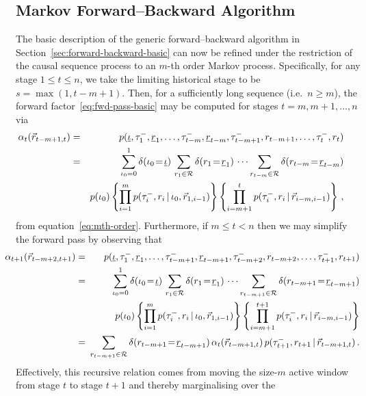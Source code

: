 \documentclass[a4paper]{article}
\newcommand{\ui}{\underline{\iota}}
\newcommand{\ur}{\underline{r}}
\newcommand{\vr}{\vec{r}}
\newcommand{\tm}{\tau^{-}}
\begin{document}
\subsection{Markov Forward--Backward Algorithm}
\label{sec:forward-backward-markov}

The basic description of the generic forward--backward algorithm in Section~\ref{sec:forward-backward-basic}
can now be refined under the restriction of the causal sequence process to an $m$-th order Markov process.
Specifically, for any stage $1\le t\le n$, we take the limiting historical stage to be $s=\max(1, t-m+1)$.
Then, for a sufficiently long sequence (i.e.\ $n\ge m$), the forward factor~\eqref{eq:fwd-pass-basic} may be
computed for stages $t=m,m+1,\ldots,n$ via
\begin{eqnarray}
\hspace*{-5mm}
\alpha_t(\vr_{t-m+1,t}) & = & p(\ui,\tm_1,\ur_1,\ldots,\tm_{t-m},\ur_{t-m},\tm_{t-m+1},r_{t-m+1},\ldots,\tm_t,r_t)
\nonumber\\& = &
\sum_{\iota_0=0}^{1}\delta(\iota_0\!=\!\ui)\,
\sum_{r_1\in{\cal R}} \delta(r_1\!=\!\ur_1)\,
\cdots
\sum_{r_{t-m}\in{\cal R}} \delta(r_{t-m}\!=\!\ur_{t-m})
\nonumber\\&&
p(\iota_0)\left\{\prod_{i=1}^{m}p(\tm_i,r_i\,|\,\iota_0,\vr_{1,i-1})\right\}
\left\{\prod_{i=m+1}^{t}p(\tm_i,r_i\,|\,\vr_{i-m,i-1})\right\}\,,
\label{eq:fwd-pass-m}
\end{eqnarray}
from equation~\eqref{eq:mth-order}. 
Furthermore, if $m\le t<n$ then we may simplify the forward pass by observing that
\begin{eqnarray}
\!\!\!\!\!\!\!
\alpha_{t+1}(\vr_{t-m+2,t+1}) & = & 
p(\ui,\tm_1,\ur_1,\ldots,\tm_{t-m+1},\ur_{t-m+1},\tm_{t-m+2},r_{t-m+2},\ldots,\tm_{t+1},r_{t+1})
\nonumber\\& = &
\sum_{\iota_0=0}^{1}\delta(\iota_0\!=\!\ui)\,
\sum_{r_1\in{\cal R}} \delta(r_1\!=\!\ur_1)\,
\cdots
\sum_{r_{t-m+1}\in{\cal R}} \delta(r_{t-m+1}\!=\!\ur_{t-m+1})
\nonumber\\&&
p(\iota_0)\left\{\prod_{i=1}^{m}p(\tm_i,r_i\,|\,\iota_0,\vr_{1,i-1})\right\}
\left\{\prod_{i=m+1}^{t+1}p(\tm_i,r_i\,|\,\vr_{i-m,i-1})\right\}
\nonumber\\& = &\!\!\!
\sum_{r_{t-m+1}\in{\cal R}} \delta(r_{t-m+1}\!=\!\ur_{t-m+1})\,\alpha_t(\vr_{t-m+1,t})
\,p(\tm_{t+1},r_{t+1}\,|\,\vr_{t-m+1,t})\,.
\label{eq:fwd-pass-m-recursive}
\end{eqnarray}
Effectively, this recursive relation comes from moving the size-$m$ active window from stage $t$ to stage $t+1$ and thereby marginalising over the
\end{document}
